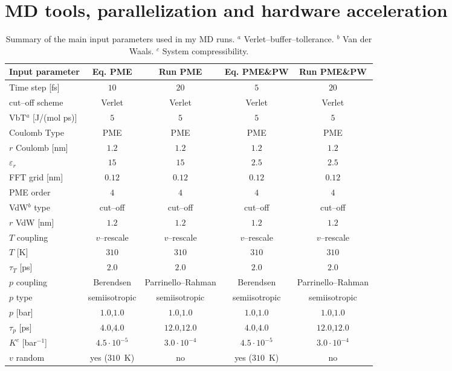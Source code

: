 \chapter{MD tools, parallelization and hardware acceleration}


\begin{table}[h!t]
	\centering\footnotesize
	\begin{tabular}{lcccc}
		\toprule
		Input parameter & Eq. \acs{PME} & Run \acs{PME} & Eq. \acs{PME}\&\acs{PW} & Run \acs{PME}\&\acs{PW} \\ \toprule
		Time step [fs]		&	$10$ & $20$ & $5$ & $20$ \\ \midrule
		cut--off scheme		& Verlet & Verlet & Verlet & Verlet \\ \midrule
		VbT$^a$ [J/(mol ps)]& $5$ & $5$ & $5$ & $5$ \\ \midrule
		Coulomb Type		& \acs{PME}	& \acs{PME}	& \acs{PME} & \acs{PME} \\ \midrule
		$r$ Coulomb	[nm]	& $1.2$ & $1.2$ & $1.2$ & $1.2$ \\ \midrule
		$\varepsilon_r$		& $15$ & $15$ & $2.5$ & $2.5$ \\ \midrule
		\acs{FFT} grid [nm]	& $0.12$ & $0.12$ & $0.12$ & $0.12$ \\ \midrule
	    \acs{PME} order		& $4$ & $4$ & $4$ & $4$ \\ \midrule
		VdW$^b$ type		& cut--off & cut--off & cut--off & cut--off \\ \midrule
		$r$ VdW [nm]		& $1.2$ & $1.2$ & $1.2$ & $1.2$ \\ \midrule
		$T$ coupling		& $v$--rescale & $v$--rescale & $v$--rescale & $v$--rescale \\ \midrule
		$T$ [K]				& $310$ & $310$ & $310$ & $310$  \\ \midrule
		$\tau_T$ [ps]		& $2.0$ & $2.0$ & $2.0$ & $2.0$ \\ \midrule
		$p$ coupling		& Berendsen & Parrinello--Rahman & Berendsen & Parrinello--Rahman \\ \midrule
		$p$ type			& semiisotropic & semiisotropic & semiisotropic & semiisotropic \\ \midrule
		$p$ [bar]			& $1.0$,$1.0$ & $1.0$,$1.0$ & $1.0$,$1.0$ & $1.0$,$1.0$ \\ \midrule
		$\tau_p$ [ps]		& $4.0$,$4.0$ & $12.0$,$12.0$ & $4.0$,$4.0$ & $12.0$,$12.0$ \\ \midrule
		$K^c$ [bar$^{-1}$]	& $4.5\cdot 10^{-5}$ & $3.0\cdot 10^{-4}$ & $4.5\cdot 10^{-5}$ & $3.0\cdot 10^{-4}$ \\ \midrule
		$v$ random			& yes ($310$~K) & no & yes ($310$~K) & no \\ \bottomrule 
	\end{tabular}
	\caption{Summary of the main input parameters used in my \acs{MD} runs. $^a$ Verlet--buffer--tollerance. $^b$ Van der Waals. $^c$ System compressibility.}
	\label{tab:inputParam}
\end{table}
